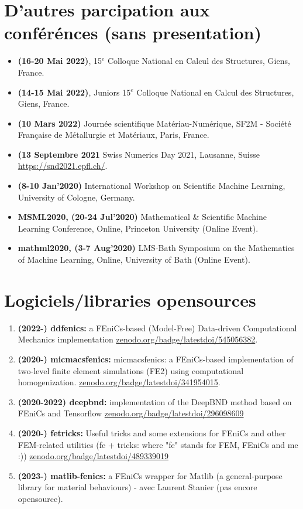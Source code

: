\documentclass[french]{article}
\begin{document}
\section*{D'autres parcipation aux conférénces (sans presentation)}
\begin{itemize} 
\item \textbf{(16-20 Mai 2022)}, 15$^{e}$ Colloque National en Calcul des Structures, Giens, France.
\item \textbf{(14-15 Mai 2022)}, Juniors 15$^{e}$ Colloque National en Calcul des Structures, Giens, France.
\item \textbf{(10 Mars 2022)} Journée scientifique Matériau-Numérique, SF2M - Société  Française de Métallurgie et Matériaux, Paris, France.
\item \textbf{(13 Septembre 2021} Swiss Numerics Day 2021, Lausanne, Suisse  \url{https://snd2021.epfl.ch/}. 
\item \textbf{(8-10 Jan'2020)} International Workshop on Scientific Machine Learning, University of Cologne, Germany.
\item \textbf{MSML2020, (20-24 Jul'2020)}  Mathematical \& Scientific Machine Learning Conference, Online, Princeton University (Online Event).
\item \textbf{mathml2020, (3-7 Aug'2020)}  LMS-Bath Symposium on the Mathematics of Machine Learning, Online, University of Bath (Online Event).
\end{itemize}


\section*{Logiciels/libraries opensources} \label{sec:libraries}
\begin{enumerate}
\item \textbf{(2022-) ddfenics:} a FEniCs-based (Model-Free) Data-driven Computational Mechanics implementation \url{zenodo.org/badge/latestdoi/545056382}.
\item \textbf{(2020-) micmacsfenics:} micmacsfenics: a FEniCs-based implementation of two-level finite element simulations (FE2) using computational homogenization. \url{zenodo.org/badge/latestdoi/341954015}.
\item \textbf{(2020-2022) deepbnd:} implementation of the DeepBND method based on FEniCs and Tensorflow \url{zenodo.org/badge/latestdoi/296098609}
\item \textbf{(2020-) fetricks:} Useful tricks and some extensions for FEniCs and other FEM-related utilities (fe + tricks: where "fe" stands for FEM, FEniCs and me :)) \url{zenodo.org/badge/latestdoi/489339019}
\item \textbf{(2023-) matlib-fenics:} a FEniCs wrapper for Matlib (a general-purpose library for material behaviours) - avec Laurent Stanier (pas encore opensource).
\end{enumerate}
\end{document}
